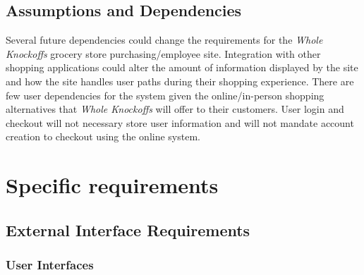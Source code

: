\documentclass{scrreprt}
\theoremstyle{funreq}
\begin{document}
\section{Assumptions and Dependencies}
Several future dependencies could change the requirements for the \textit{Whole Knockoffs} grocery store purchasing/employee site. Integration with other shopping applications could alter the amount of information displayed by the site and how the site handles user paths during their shopping experience. There are few user dependencies for the system given the online/in-person shopping alternatives that \textit{Whole Knockoffs} will offer to their customers. User login and checkout will not necessary store user information and will not mandate account creation to checkout using the online system. %



{\let\clearpage\relax 
\chapter{Specific requirements}}

\section{External Interface Requirements}

\subsection{User Interfaces}
\end{document}
